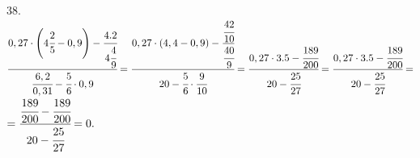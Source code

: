38. $\cfrac{0,27\cdot\left(4\cfrac{2}{5}-0,9\right)-\cfrac{4.2}{4\cfrac{4}{9}}}
{\cfrac{6,2}{0,31}-\cfrac{5}{6}\cdot0,9}=\cfrac{0,27\cdot\left(4,4-0,9\right)-\cfrac{\cfrac{42}{10}}{\cfrac{40}{9}}}
{20-\cfrac{5}{6}\cdot\cfrac{9}{10}}=\cfrac{0,27\cdot3.5-\cfrac{189}{200}}
{20-\cfrac{25}{27}}=\cfrac{0,27\cdot3.5-\cfrac{189}{200}}
{20-\cfrac{25}{27}}=$\\$=\cfrac{\cfrac{189}{200}-\cfrac{189}{200}}
{20-\cfrac{25}{27}}=0.$\\

